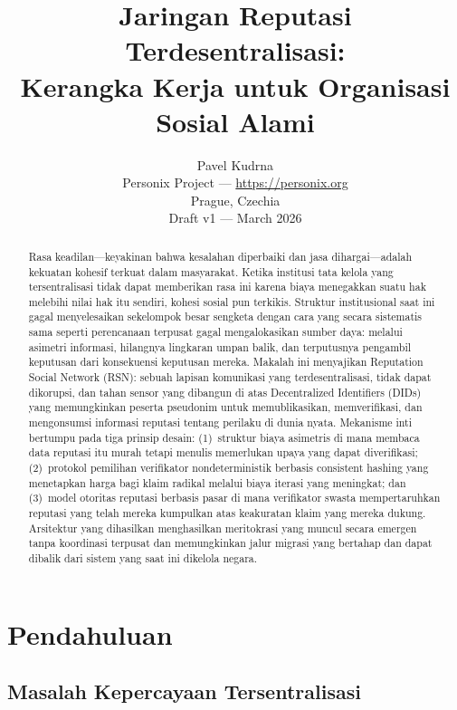 \documentclass[11pt,a4paper,twocolumn]{article}
\title{\textbf{Jaringan Reputasi Terdesentralisasi:\\Kerangka Kerja untuk Organisasi Sosial Alami}}
\author{Pavel Kudrna\\Personix Project --- \url{https://personix.org}\\Prague, Czechia\\Draft v1 --- March 2026}
\date{}
\begin{document}
\maketitle

\begin{abstract}
Rasa keadilan---keyakinan bahwa kesalahan diperbaiki dan jasa dihargai---adalah kekuatan kohesif terkuat dalam masyarakat. Ketika institusi tata kelola yang tersentralisasi tidak dapat memberikan rasa ini karena biaya menegakkan suatu hak melebihi nilai hak itu sendiri, kohesi sosial pun terkikis. Struktur institusional saat ini gagal menyelesaikan sekelompok besar sengketa dengan cara yang secara sistematis sama seperti perencanaan terpusat gagal mengalokasikan sumber daya: melalui asimetri informasi, hilangnya lingkaran umpan balik, dan terputusnya pengambil keputusan dari konsekuensi keputusan mereka. Makalah ini menyajikan Reputation Social Network (RSN): sebuah lapisan komunikasi yang terdesentralisasi, tidak dapat dikorupsi, dan tahan sensor yang dibangun di atas Decentralized Identifiers (DIDs) yang memungkinkan peserta pseudonim untuk memublikasikan, memverifikasi, dan mengonsumsi informasi reputasi tentang perilaku di dunia nyata. Mekanisme inti bertumpu pada tiga prinsip desain: (1)~struktur biaya asimetris di mana membaca data reputasi itu murah tetapi menulis memerlukan upaya yang dapat diverifikasi; (2)~protokol pemilihan verifikator nondeterministik berbasis consistent hashing yang menetapkan harga bagi klaim radikal melalui biaya iterasi yang meningkat; dan (3)~model otoritas reputasi berbasis pasar di mana verifikator swasta mempertaruhkan reputasi yang telah mereka kumpulkan atas keakuratan klaim yang mereka dukung. Arsitektur yang dihasilkan menghasilkan meritokrasi yang muncul secara emergen tanpa koordinasi terpusat dan memungkinkan jalur migrasi yang bertahap dan dapat dibalik dari sistem yang saat ini dikelola negara.
\end{abstract}

\section{Pendahuluan}

\subsection{Masalah Kepercayaan Tersentralisasi}
\end{document}
